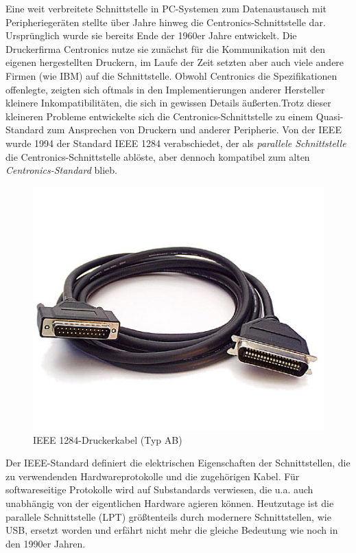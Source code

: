 \documentclass[a4paper,11pt]{article}
\begin{document}
Eine weit verbreitete Schnittstelle in PC-Systemen zum Datenaustausch mit Peripheriegeräten stellte über Jahre hinweg die Centronics-Schnittstelle dar. Ursprünglich wurde sie bereits Ende der 1960er Jahre entwickelt. Die Druckerfirma Centronics nutze sie zunächst für die Kommunikation mit den eigenen hergestellten Druckern, im Laufe der Zeit setzten aber auch viele andere Firmen (wie IBM) auf die Schnittstelle. Obwohl Centronics die Spezifikationen offenlegte, zeigten sich oftmals in den Implementierungen anderer Hersteller kleinere Inkompatibilitäten, die sich in gewissen Details äußerten.Trotz dieser kleineren Probleme entwickelte sich die Centronics-Schnittstelle zu einem Quasi-Standard zum Ansprechen von Druckern und anderer Peripherie. Von der IEEE wurde 1994 der Standard IEEE 1284 verabschiedet, der als \textit{parallele Schnittstelle} die Centronics-Schnittstelle ablöste, aber dennoch kompatibel zum alten \textit{Centronics-Standard} blieb. 
\begin{figure}[h]
 \centering
 \includegraphics[scale=0.5]{./pics/IEEE1284Printercable_2007_04.jpg}
	\caption{IEEE 1284-Druckerkabel (Typ AB)} 	
\end{figure}
Der IEEE-Standard definiert die elektrischen Eigenschaften der Schnittstellen, die zu verwendenden Hardwareprotokolle und die zugehörigen Kabel. Für softwareseitige Protokolle wird auf Substandards verwiesen, die u.a. auch unabhängig von der eigentlichen Hardware agieren können. Heutzutage ist die parallele Schnittstelle (LPT) größtenteils durch modernere Schnittstellen, wie USB, ersetzt worden und erfährt nicht mehr die gleiche Bedeutung wie noch in den 1990er Jahren. 
\end{document}
